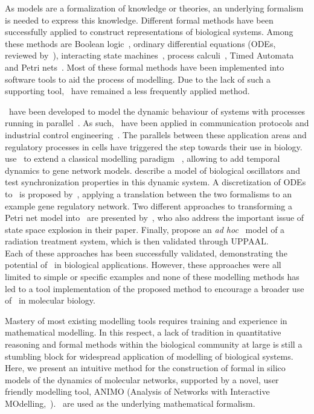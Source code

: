 As models are a formalization of knowledge or theories, an underlying formalism is needed to express
this knowledge. Different formal methods have been successfully applied to construct representations
of biological systems. Among these methods are Boolean logic~\citep{boolean-networks-flower,boolean-networks2},
ordinary differential equations (ODEs, reviewed by~\citealp[]{hidde-review}),
interacting state machines~\citep{interacting-sm1,interacting-sm2},
process calculi~\citep{blenx,bio-pepa}, Timed Automata~\citep{ta-siebert,bartocci-oscillators,
oded-ode-ta-discretization} and Petri nets~\citep{petri-nets,petri-nets2}.
Most of these formal methods have been implemented into software tools to aid the process
of modelling. Due to the lack of such a supporting tool, \tas\ have remained a less 
frequently applied method.

\tas\ have been developed to model the dynamic behaviour of systems with processes running in parallel~\citep{timed-automata-alur-dill}. 
As such, \tas\ have been applied in communication protocols and industrial control engineering~\citep{ta-audio-protocol,ta-wap-gateway,ta-ws-bap}. The 
parallels between these application areas and regulatory processes in cells have triggered the step towards 
their use in biology.
\cite{ta-siebert} use \tas\ to extend a classical modelling paradigm
~\citep{thomas-formalism}, allowing to add temporal dynamics to gene network models.
\cite{bartocci-oscillators} describe a model of biological oscillators and test 
synchronization properties in this dynamic system.
A discretization of ODEs to \tas\ is proposed by~\citet{oded-ode-ta-discretization}, applying
a translation between the two formalisms to an example gene regulatory network. Two 
different approaches to transforming
a Petri net model into \tas\ are presented by~\citet{ta-giapponesi},
who also address the important issue of state space explosion in their paper.
Finally, \cite{ta-radiazioni} propose an \emph{ad hoc} \tas\ model of a radiation treatment
system, which is then validated through UPPAAL.\\
Each of these approaches has been successfully validated, demonstrating the potential of \tas\
in biological applications. However, these approaches were all limited to simple
or specific examples and none of these modelling methods
has led to a tool implementation of the proposed method to encourage a broader use
of \tas\ in molecular biology.

Mastery of most existing modelling tools requires training and experience in mathematical modelling. 
In this respect, a lack of tradition in quantitative
reasoning and formal methods within the biological community at large is still a stumbling block for
widespread application of modelling of biological systems. Here, we present an intuitive method for the
construction of formal in silico models of the dynamics of molecular networks, supported by a novel,
user friendly modelling tool, ANIMO (Analysis of Networks with Interactive 
MOdelling,~\citealp[]{animo-bibe}). \tas\ are used as the underlying mathematical formalism.

